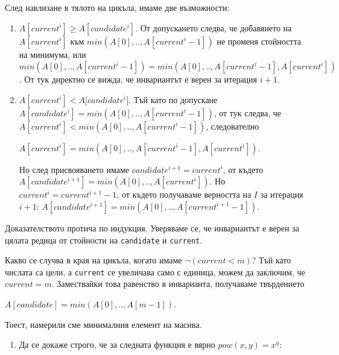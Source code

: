 \documentclass[12pt,a4paper]{article}
\newcommand{\code}[1]{\texttt{#1}}
\begin{document}
{\begin{mdframed}[hidealllines=true,backgroundcolor=gray!20]
След навлизане в тялото на цикъла, имаме две възможности:
\begin{enumerate}[label=\arabic*)]
  \item $A[current^i]\geq A[candidate^i]$. От допускането следва, че добавянето на $A[current^i]$ към $min(A[0],..,A[current^i-1])$ не променя стойността на минимума, или $min(A[0],..,A[current^i-1])=min(A[0],..,A[current^i-1],A[current^i])$. От тук директно се вижда, че инвариантът е верен за итерация $i+1$.
  \item $A[current^i] < A[candidate^i$]. Тъй като по допускане $A[candidate^i] = min(A[0], .., A[current^i-1])$, от тук следва, че $A[current^i] < min(A[0], .., A[current^i-1])$, следователно

   $A[current^i] = min(A[0], .., A[current^i-1], A[current^i])$.

   Но след присвояването имаме $candidate^{i+1} = current^i$, от където $A[candidate^{i+1}] = min(A[0],..,A[current^i])$. Но $current^i = current^{i+1}-1$, от където получаваме верността на $I$ за итерация $i+1$: $A[candidate^{i+1}] = min(A[0], .., A[current^{i+1}-1])$.

\end{enumerate}
  Доказателството протича по индукция. Уверяваме се, че инвариантът е верен за цялата редица от стойности на \code{candidate} и \code{current}.

  Какво се случва в края на цикъла, когато имаме $\neg(current<m)$? Тъй като числата са цели, а \code{current} се увеличава само с единица, можем да заключим, че $current=m$. Замествайки това равенство в инварианта, получаваме твърдението

  $A[candidate] = min(A[0], .., A[m-1])$.

  Тоест, намерили сме минималния елемент на масива.
\end{mdframed}

\begin{enumerate}[resume]
  \item Да се докаже строго, че за следната функция е вярно $pow(x,y)=x^y$:
  \begin{enumerate}[label=\alph*)]%


\end{enumerate}
\end{enumerate}}
\end{document}
